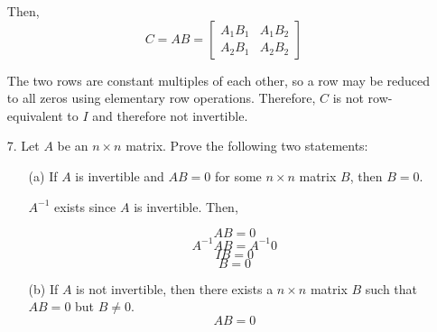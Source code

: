 \documentclass{article}
\begin{document}
\begin{enumerate}[listparindent=\parindent]
Then,
\[
    C = AB = \begin{bmatrix}
        A_1B_1 & A_1B_2 \\
        A_2B_1 & A_2B_2
    \end{bmatrix}
\]

The two rows are constant multiples of each other, so a row may be reduced to all zeros
using elementary row operations.
Therefore, \(C\) is not row-equivalent to \(I\) and therefore not invertible.

\item[7.] Let \(A\) be an \(n \times n\) matrix. Prove the following two statements:
\begin{enumerate}[listparindent=\parindent]
\item[(a)] If \(A\) is invertible and \(AB = 0\) for some \(n \times n\) matrix \(B\), then \(B = 0\).

\(A^{-1}\) exists since \(A\) is invertible. Then,

\[AB = 0\]
\[A^{-1}AB = A^{-1}0\]
\[IB = 0\]
\[B = 0\]

\item[(b)] If \(A\) is not invertible, then there exists a \(n \times n\) matrix \(B\) such that \(AB = 0\) but \(B \neq 0\).
\[AB = 0\]
\end{enumerate}

\end{enumerate}
\end{document}
